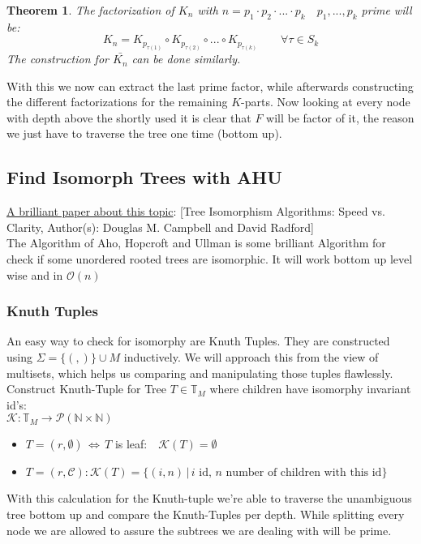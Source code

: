 \documentclass[a4paper,12pt]{article}
\newtheorem{theorem}{Theorem}[section]
\theoremstyle{definition}
\begin{document}
	\begin{theorem}
		The factorization of $K_n$ with $n=p_1\cdot p_2\cdot ...\cdot p_k\quad p_1,...,p_k $ prime will be:
		\[K_n = K_{p_{\tau(1)}} \circ K_{p_{\tau(2)}}\circ ...\circ K_{p_{\tau(k)}}\qquad \forall \tau\in S_k \] 
		The construction for $\bar{K_n}$ can be done similarly.
	\end{theorem}
	With this we now can extract the last prime factor, while afterwards constructing the different factorizations for the remaining $K$-parts. Now looking at every node with depth above the shortly used it is clear that $F$ will be factor of it, the reason we just have to traverse the tree one time (bottom up).
	
		
	\subsection{Find Isomorph Trees with AHU}
	\hyperlink{www.jstor.org/stable/pdf/2690833.pdf}{A brilliant paper about this topic}: [Tree Isomorphism Algorithms: Speed vs. Clarity,\quad
	Author(s): Douglas M. Campbell and David Radford]\\
	The Algorithm of Aho, Hopcroft and Ullman is some brilliant Algorithm for check if some unordered rooted trees are isomorphic. It will work bottom up level wise and in $\mathcal{O}(n)$
	\subsubsection{Knuth Tuples}
	An easy way to check for isomorphy are Knuth Tuples. They are constructed using $\Sigma =\{(,)\}\cup M$ inductively. We will approach this from the view of multisets, which helps us comparing and manipulating those tuples flawlessly. 
	Construct Knuth-Tuple for Tree $T\in \mathds{T}_M$ where children have isomorphy invariant id's:\\
	$\mathcal{K}: \mathds{T}_M \longrightarrow \mathcal{P}(\mathds{N}\times \mathds{N})$
	\begin{itemize}
		\item $T=(r,\emptyset)\,\Leftrightarrow\, T$  is leaf:$\quad \mathcal{K} (T) =\emptyset$
		\item $T=(r,\mathcal{C}): \mathcal{K}(T)=\{(i, n)\,|\, i \text{ id},\, n \text{ number of children with this id} \}$
	\end{itemize}
	With this calculation for the Knuth-tuple we're able to traverse the unambiguous tree bottom up and compare the Knuth-Tuples per depth. While splitting every node we are allowed to assure the subtrees we are dealing with will be prime.
\end{document}
